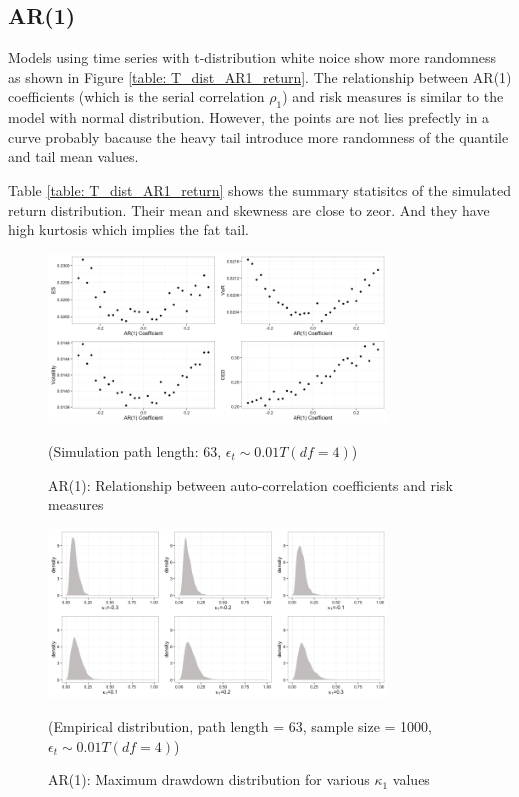 \documentclass[11pt]{article}
\begin{document}
\subsection{AR(1)}

Models using time series with t-distribution white noice show more randomness as shown in Figure \ref{table: T_dist_AR1_return}. The relationship between AR(1) coefficients (which is the serial correlation $\rho_1$) and risk measures is similar to the model with normal distribution. However, the points are not lies prefectly in a curve probably bacause the heavy tail introduce more randomness of the quantile and tail mean values. 

Table \ref{table: T_dist_AR1_return} shows the summary statisitcs of the simulated return distribution. Their mean and skewness are close to zeor. And they have high kurtosis which implies the fat tail.

\begin{figure}[H]
\centering
\includegraphics[width = 0.8\textwidth]{../figures/simulation/T_dist_AR1_risk_measures}
\caption{AR(1): Relationship between auto-correlation coefficients and risk measures}
(Simulation path length: 63, $\epsilon_t \sim 0.01T(df = 4)$)
\label{fig:T_dist_AR1_risk_measures}
\end{figure}



\begin{figure}[H]
\centering
\includegraphics[width = 0.8\textwidth]{../figures/simulation/T_dist_AR1_maxDrawdown_dist}
\caption{AR(1): Maximum drawdown distribution for various $\kappa_1$ values }
(Empirical distribution, path length = 63, sample size = 1000, $\epsilon_t \sim 0.01T(df = 4)$)
\label{fig:T_dist_AR1_maxDrawdown_dist}
\end{figure}
\end{document}
